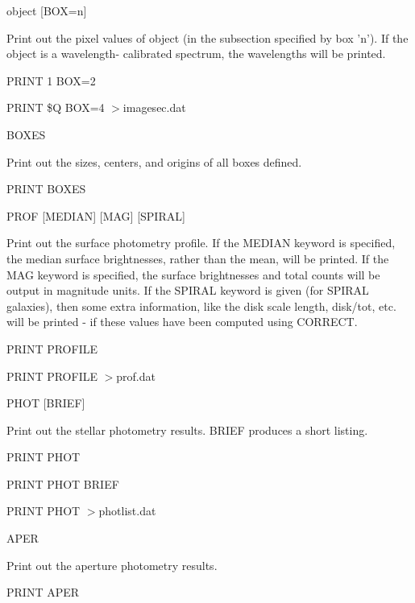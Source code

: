 {\newpage\clearpage
{}%
\begin{example}
  \item[object {[BOX=n]}\hfill]{ Print out the pixel values of object (in
       the subsection specified by box 'n').  If the object is a
       wavelength- calibrated spectrum, the wavelengths will be printed.
  \begin{hanging}
    \item{PRINT 1 BOX=2}
    \item{PRINT \$Q BOX=4 $>$imagesec.dat}
  \end{hanging}
}
\par\item[BOXES\hfill]{Print out the sizes, centers, and origins of all boxes
       defined.
  \begin{hanging}
    \item{PRINT BOXES}
  \end{hanging}
}
\par\item[PROF {[MEDIAN]} {[MAG]} {[SPIRAL]}\hfill]{ Print out the surface
       photometry profile.  If the MEDIAN keyword is specified, the median
       surface brightnesses, rather than the mean, will be printed. If the
       MAG keyword is specified, the surface brightnesses and total counts
       will be output in magnitude units. If the SPIRAL keyword is given
       (for SPIRAL galaxies), then some extra information, like the disk
       scale length, disk/tot, etc. will be printed - if these values have
       been computed using CORRECT.
  \begin{hanging}
    \item{PRINT PROFILE}
    \item{PRINT PROFILE $>$prof.dat}
  \end{hanging}
}
\par\item[PHOT {[BRIEF]}\hfill]{ Print out the stellar photometry results.
       BRIEF produces a short listing.
  \begin{hanging}
    \item{PRINT PHOT }
    \item{PRINT PHOT BRIEF}
    \item{PRINT PHOT $>$photlist.dat}
  \end{hanging}
}
\par\item[APER\hfill]{ Print out the aperture photometry results.
  \begin{hanging}
    \item{PRINT APER}

\end{hanging}}
\end{example}}
